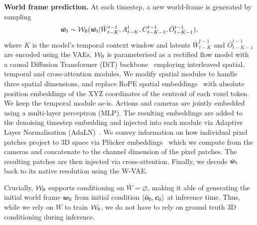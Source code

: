 \documentclass{article}
\theoremstyle{plain}
\theoremstyle{definition}
\theoremstyle{remark}
\begin{document}
\textbf{World frame prediction.} At each timestep, a new world-frame is generated by sampling 
\begin{equation}
  \bar{{\bm{w}}}_t \sim {\mathcal{W}}_\theta(\bar{{\bm{w}}_t} | \bar{W}^{t-1}_{t-K}, A^t_{t-K}, C^{t-1}_{t-K-1}, \bar{O}^{t-1}_{t-K-1}),  
\end{equation}
where $K$ is the model's temporal context window and latents $\bar{W}^{t-1}_{t-K}$ and $\bar{O}^{t-1}_{t-K-1}$ are encoded using the VAEs. 
${\mathcal{W}}_\theta$ is parameterised as a rectified flow model with a causal Diffusion Transformer (DiT) backbone~\citep{peebles2023scalable} employing interleaved spatial, temporal and cross-attention modules.
We modify spatial modules to handle three spatial dimensions, and replace RoPE spatial embeddings~\citep{su2024roformer} with absolute position embeddings of the XYZ coordinates of the centroid of each voxel token.
We keep the temporal module as-is.
Actions and cameras are jointly embedded using a multi-layer perceptron (MLP).
The resulting embeddings are added to the denoising timestep embedding and injected into each module via Adaptive Layer Normalisation (AdaLN)~\citep{peebles2023scalable}.
We convey information on how individual pixel patches project to 3D space via Pl\"ucker embeddings~\citep{xiao2025worldmem,sitzmann2021light} which we compute from the cameras and concatenate to the channel dimension of the pixel patches.
The resulting patches are then injected via cross-attention.
Finally, we decode $\bar{{\bm{w}}}_t$ back to its native resolution using the W-VAE.

Crucially, ${\mathcal{W}}_\theta$ supports conditioning on $\bar{W}=\varnothing$, making it able of generating the initial world frame ${\bm{w}}_0$ from initial condition $\langle \bar{{\bm{o}}}_0, {\bm{c}}_0 \rangle$ at inference time.
Thus, while we rely on $W$ to train ${\mathcal{W}}_\theta$, we do not have to rely on ground truth 3D conditioning during inference.


\end{document}
